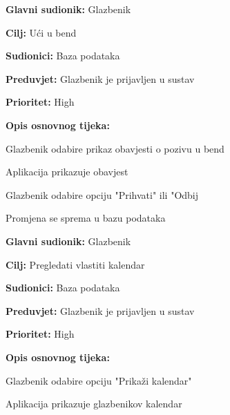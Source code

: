 \noindent {}
	\begin{packed_item}
		
		\item \textbf{Glavni sudionik:} Glazbenik
		\item \textbf{Cilj: } Ući u bend
		\item \textbf{Sudionici:} Baza podataka
		\item \textbf{Preduvjet:} Glazbenik je prijavljen u sustav
		\item \textbf{Prioritet:} High
		\item \textbf{Opis osnovnog tijeka:} 
		
		\item[] \begin{packed_enum}
			
			\item Glazbenik odabire prikaz obavjesti o pozivu u bend
			\item Aplikacija prikazuje obavjest
			\item Glazbenik odabire opciju "Prihvati" ili "Odbij
			\item Promjena se sprema u bazu podataka
		\end{packed_enum}
		
	\end{packed_item}
		
\noindent {}
	\begin{packed_item}
		
		\item \textbf{Glavni sudionik: } Glazbenik
		\item \textbf{Cilj:} Pregledati vlastiti kalendar
		\item \textbf{Sudionici:} Baza podataka
		\item \textbf{Preduvjet:} Glazbenik je prijavljen u sustav
		\item \textbf{Prioritet:} High
		\item \textbf{Opis osnovnog tijeka:} 
		
		\item[] \begin{packed_enum}
			
			\item Glazbenik odabire opciju "Prikaži kalendar"
			\item Aplikacija prikazuje glazbenikov kalendar
		\end{packed_enum}  
	\end{packed_item}
	

